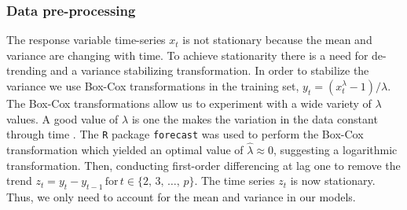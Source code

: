       \subsubsection{Data pre-processing}

         The response variable time-series $x_{t}$ is not stationary because the mean and variance are changing with time. To achieve stationarity there is a need for de-trending and a variance stabilizing transformation. In order to stabilize the variance we use Box-Cox transformations in the training set, $y_{t} = (x_{t}^{\lambda} - 1) / \lambda$. The Box-Cox transformations allow us to experiment with a wide variety of $\lambda$ values. A good value of $\lambda$ is one the makes the variation in the data constant through time \cite{Watson2025}. The \texttt{R} package \texttt{forecast} was used to perform the Box-Cox transformation which yielded an optimal value of $\hat{\lambda} \approx 0$, suggesting a logarithmic transformation. Then, conducting first-order differencing at lag one to remove the trend $z_{t} = y_{t} - y_{t-1} \, \text{for} \, t \in \{2, \, 3, \, \ldots, \, p\}$. The time series $z_{t}$ is now stationary. Thus, we only need to account for the mean and variance in our models.

